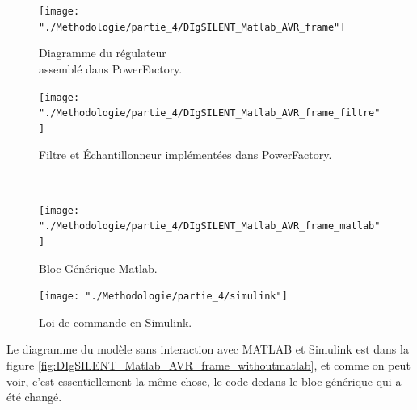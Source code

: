 \begin{minipage}{\textwidth}
	\centering
\begin{minipage}{.475\textwidth}
	\begin{figure}[H]
		\captionsetup{justification=centering,margin=0cm}
		\begin{center}	
			\texttt{[image: "./Methodologie/partie\_4/DIgSILENT\_Matlab\_AVR\_frame"]}
			\caption{Diagramme du régulateur \\assemblé dans PowerFactory.}
			\label{fig:DIgSILENT_Matlab_AVR_frame}
		\end{center}
	\end{figure}
\end{minipage}
\begin{minipage}{.475\textwidth}
	\begin{figure}[H]
		\captionsetup{justification=centering,margin=0cm}
		\begin{center}	
			\texttt{[image: "./Methodologie/partie\_4/DIgSILENT\_Matlab\_AVR\_frame\_filtre"]}
			\caption{Filtre et Échantillonneur implémentées dans PowerFactory.}
			\label{fig:DIgSILENT_Matlab_AVR_frame_filtre}
		\end{center}
	\end{figure}
\end{minipage}\\
\begin{minipage}{.475\textwidth}
\begin{figure}[H]
	\captionsetup{justification=centering,margin=0cm}
	\begin{center}	
		\texttt{[image: "./Methodologie/partie\_4/DIgSILENT\_Matlab\_AVR\_frame\_matlab"]}
		\caption{Bloc Générique Matlab.}
		\label{fig:DIgSILENT_Matlab_AVR_frame_matlab}
	\end{center}
\end{figure}
\end{minipage}
\begin{minipage}{.475\textwidth}
\begin{figure}[H]
	\captionsetup{justification=centering,margin=0cm}
	\begin{center}	
		\texttt{[image: "./Methodologie/partie\_4/simulink"]}
		\caption{Loi de commande en Simulink.}
		\label{fig:simulink}
	\end{center}
\end{figure}
\end{minipage}
\end{minipage}

Le diagramme du modèle sans interaction avec MATLAB et Simulink est dans la figure \ref{fig:DIgSILENT_Matlab_AVR_frame_withoutmatlab}, et comme on peut voir, c'est  essentiellement la même chose, le code dedans le bloc générique qui a été changé.

